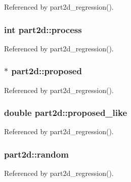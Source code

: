 Referenced by part2d\+\_\+regression().

\subsubsection[{\texorpdfstring{process}{process}}]{\setlength{\rightskip}{0pt plus 5cm}int part2d\+::process}\hypertarget{structpart2d_ad8f3d80056c2a99079cdb9a39bd4d9cd}{}\label{structpart2d_ad8f3d80056c2a99079cdb9a39bd4d9cd}


Referenced by part2d\+\_\+regression().

\subsubsection[{\texorpdfstring{proposed}{proposed}}]{$\ast$ part2d\+::proposed}\hypertarget{structpart2d_a5e5a15189e5e3b4320372369e920bab9}{}\label{structpart2d_a5e5a15189e5e3b4320372369e920bab9}


Referenced by part2d\+\_\+regression().

\subsubsection[{\texorpdfstring{proposed\+\_\+like}{proposed_like}}]{\setlength{\rightskip}{0pt plus 5cm}double part2d\+::proposed\+\_\+like}\hypertarget{structpart2d_ad98128b1a503b685fd864a562ea838b0}{}\label{structpart2d_ad98128b1a503b685fd864a562ea838b0}


Referenced by part2d\+\_\+regression().

\subsubsection[{\texorpdfstring{random}{random}}]{ part2d\+::random}\hypertarget{structpart2d_aa876ee904fd268d0129fd8de8f74e62d}{}\label{structpart2d_aa876ee904fd268d0129fd8de8f74e62d}


Referenced by part2d\+\_\+regression().

